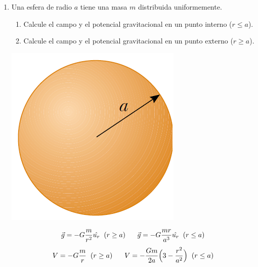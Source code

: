 \documentclass[11pt,twocolumn]{article}
\begin{document}
\begin{enumerate}
\item Una esfera de radio $a$ tiene una masa $m$ distribuida uniformemente. 
\begin{enumerate}
\item Calcule el campo y el potencial gravitacional en un punto interno ($r \leq a$).  
\item Calcule el campo y el potencial gravitacional en un punto externo ($r\geq a$).  
\end{enumerate}
{
\begin{center}
\includegraphics[scale=0.2]{esfera}
\end{center}
}
\begin{displaymath}
\vec{g}=-G\dfrac{m}{r^2}\hat{u_{r}} \hspace{0.2 cm} (r \geq a) \hspace{0.6 cm} \vec{g}=-G\dfrac{m r}{a^3}\hat{u_{r}} \hspace{0.2 cm} (r \leq a)
\end{displaymath}
\begin{displaymath}
V=-G\dfrac{m}{r} \hspace{0.2 cm} (r\geq a) \hspace{0.6 cm} V=-\dfrac{G m}{2a}\Big(3-\dfrac{r^2}{a^2}\Big) \hspace{0.2 cm} (r\leq a)
\end{displaymath}



\end{enumerate}
\end{document}
